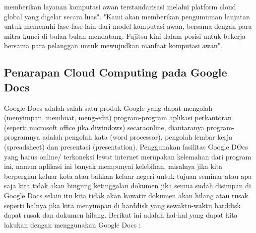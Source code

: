 memberikan layanan komputasi awan terstandarisasi melalui platform cloud global yang digelar secara luas". "Kami akan memberikan pengumuman lanjutan untuk memenuhi fase-fase lain dari model komputasi awan, bersama dengan para mitra kunci di bulan-bulan mendatang. Fujitsu kini dalam posisi untuk bekerja bersama para pelanggan untuk mewujudkan manfaat komputasi awan".
\subsection{Penarapan Cloud Computing pada Google Docs}
\tab Google Docs adalah salah satu produk Google yang dapat mengolah (menyimpan,
membuat, meng-edit) program-program aplikasi perkantoran (seperti microsoft office jika diwindows) secaraonline, diantaranya program-programnya adalah pengolah kata (word processor), pengolah lembar kerja (spreadsheet) dan presentasi (presentation). Penggunakan fasilitas Google DOcs yang harus online/ terkoneksi lewat internet merupakan kelemahan dari program ini, namun aplikasi ini banyak mempunyai kelebihan, misalnya jika kita berpergian keluar kota atau bahkan keluar negeri untuk tujuan seminar atau apa saja kita tidak akan bingung ketinggalan dokumen jika semua sudah disimpan di Google Docs selain itu kita tidak akan kawatir dokumen akan hilang atau rusak seperti halnya jika kita menyimpan di harddisk yang sewaktu-waktu harddisk dapat rusak dan dokumen hilang. Berikut ini adalah hal-hal yang dapat kita lakukan dengan menggunakan Google Docs :
